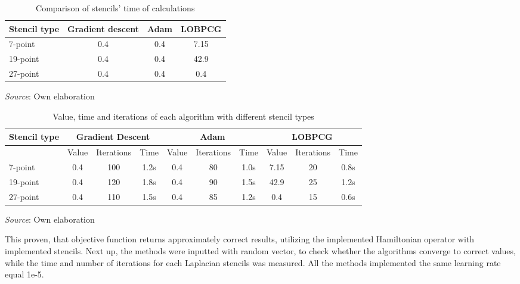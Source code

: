 \begin{table}[!ht]
	\centering
	\caption{Comparison of stencils' time of calculations}
	\label{tab:stencil-comparison-ground-state-values}
	\small %
	\begin{tabular}{|l|c|c|c|}
		\hline
		\textbf{Stencil type}    & \textbf{Gradient descent} & \textbf{Adam} & \textbf{LOBPCG} \\ \hline
		7-point                  & 0.4                       & 0.4           & 7.15       \\ \hline
		19-point                 & 0.4                       & 0.4           & 42.9       \\ \hline
		27-point                 & 0.4                       & 0.4           & 0.4        \\ \hline
	\end{tabular}
	
	\smallskip
	\small \textit{Source}: Own elaboration
\end{table}

\begin{table}[!ht]
	\centering
	\caption{Value, time and iterations of each algorithm with different stencil types}
	\label{tab:stencil-comparison}
	\small
	\begin{tabular}{|l|ccc|ccc|ccc|}
		\hline
		\textbf{Stencil type} & \multicolumn{3}{c|}{\textbf{Gradient Descent}} & \multicolumn{3}{c|}{\textbf{Adam}} & \multicolumn{3}{c|}{\textbf{LOBPCG}} \\ \hline
		& Value & Iterations & Time & Value & Iterations & Time & Value & Iterations & Time \\ \hline
		7-point              & 0.4   & 100        & 1.2s & 0.4   & 80         & 1.0s & 7.15  & 20         & 0.8s \\ \hline
		19-point             & 0.4   & 120        & 1.8s & 0.4   & 90         & 1.5s & 42.9  & 25         & 1.2s \\ \hline
		27-point             & 0.4   & 110        & 1.5s & 0.4   & 85         & 1.2s & 0.4   & 15         & 0.6s \\ \hline
	\end{tabular}
	\smallskip
	\small \textit{Source}: Own elaboration
\end{table}

This proven, that objective function returns approximately correct results, utilizing the implemented Hamiltonian operator with implemented stencils. Next up, the methods were inputted with random vector, to check whether the algorithms converge to correct values, while the time and number of iterations for each Laplacian stencils was measured. All the methods implemented the same learning rate equal 1e-5.

